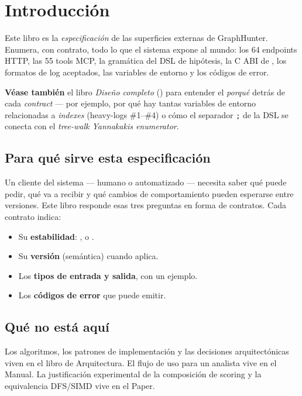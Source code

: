 \chapter{Introducción}
\label{sec:spec-intro}

Este libro es la \emph{especificación} de las superficies externas
de GraphHunter. Enumera, con contrato, todo lo que el sistema
expone al mundo: los 64 endpoints HTTP, las 55 tools MCP, la
gramática del DSL de hipótesis, la C ABI de ,
los formatos de log aceptados, las variables de entorno y los
códigos de error.

\textbf{Véase también} el libro \emph{Diseño completo}
() para entender el \emph{porqué}
detrás de cada \emph{contract} --- por ejemplo, por qué hay tantas
variables de entorno relacionadas a \emph{indexes} (heavy-logs
\#1--\#4) o cómo el separador \texttt{;} de la DSL se conecta con
el \emph{tree-walk Yannakakis enumerator}.

\section{Para qué sirve esta especificación}

Un cliente del sistema — humano o automatizado — necesita saber qué
puede pedir, qué va a recibir y qué cambios de comportamiento
pueden esperarse entre versiones. Este libro responde esas tres
preguntas en forma de contratos. Cada contrato indica:

\begin{itemize}
    \item Su \textbf{estabilidad}: , 
    o .
    \item Su \textbf{versión} (semántica) cuando aplica.
    \item Los \textbf{tipos de entrada y salida}, con un ejemplo.
    \item Los \textbf{códigos de error} que puede emitir.
\end{itemize}

\section{Qué no está aquí}

Los algoritmos, los patrones de implementación y las decisiones
arquitectónicas viven en el libro de Arquitectura. El flujo de uso
para un analista vive en el Manual. La justificación experimental
de la composición de scoring y la equivalencia DFS/SIMD vive en el
Paper.

